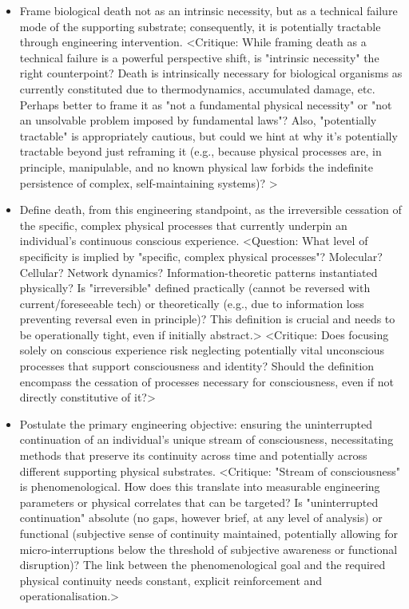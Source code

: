 \documentclass[10pt]{article}
\begin{document}
\begin{sloppypar}
  \begin{itemize}
    \item Frame biological death not as an intrinsic necessity, but as a technical failure mode of the supporting substrate; consequently, it is potentially tractable through engineering intervention. <Critique: While framing death as a technical failure is a powerful perspective shift, is "intrinsic necessity" the right counterpoint? Death is intrinsically necessary for biological organisms as currently constituted due to thermodynamics, accumulated damage, etc. Perhaps better to frame it as "not a fundamental physical necessity" or "not an unsolvable problem imposed by fundamental laws"? Also, "potentially tractable" is appropriately cautious, but could we hint at why it's potentially tractable beyond just reframing it (e.g., because physical processes are, in principle, manipulable, and no known physical law forbids the indefinite persistence of complex, self-maintaining systems)? >

    \item Define death, from this engineering standpoint, as the irreversible cessation of the specific, complex physical processes that currently underpin an individual's continuous conscious experience. <Question: What level of specificity is implied by "specific, complex physical processes"? Molecular? Cellular? Network dynamics? Information-theoretic patterns instantiated physically? Is "irreversible" defined practically (cannot be reversed with current/foreseeable tech) or theoretically (e.g., due to information loss preventing reversal even in principle)? This definition is crucial and needs to be operationally tight, even if initially abstract.> <Critique: Does focusing solely on conscious experience risk neglecting potentially vital unconscious processes that support consciousness and identity? Should the definition encompass the cessation of processes necessary for consciousness, even if not directly constitutive of it?>

    \item Postulate the primary engineering objective: ensuring the uninterrupted continuation of an individual's unique stream of consciousness, necessitating methods that preserve its continuity across time and potentially across different supporting physical substrates. <Critique: "Stream of consciousness" is phenomenological. How does this translate into measurable engineering parameters or physical correlates that can be targeted? Is "uninterrupted continuation" absolute (no gaps, however brief, at any level of analysis) or functional (subjective sense of continuity maintained, potentially allowing for micro-interruptions below the threshold of subjective awareness or functional disruption)? The link between the phenomenological goal and the required physical continuity needs constant, explicit reinforcement and operationalisation.>


\end{itemize}
\end{sloppypar}
\end{document}
